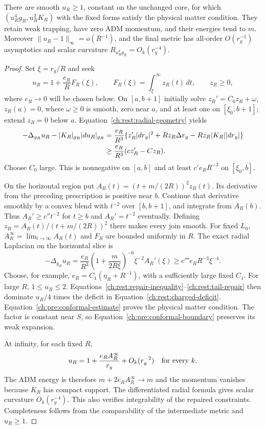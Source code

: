 \begin{lemma}
\label{ch:rest:charged-repair}
There are smooth $u_R\ge1$, constant on the unchanged core, for which
$(u_R^4g_R,u_R^2K_R)$ with the fixed forms satisfy the physical matter
condition. They retain weak trapping, have zero ADM momentum, and their
energies tend to $m$. Moreover $\|u_R-1\|_\infty=o(R^{-1})$, and
the final metric has all-order $O(r_y^{-1})$ asymptotics and
scalar curvature $R_{u_R^4g_R}=O_k(r_y^{-4})$.
\end{lemma}
\begin{proof}
Set $\xi=r_y/R$ and seek
\[
 u_R=1+\frac{e_R}{R}F_R(\xi),\qquad
 F_R(\xi)=\int_\xi^\infty z_R(t)\,dt,
 \qquad z_R\ge0,
\]
where $e_R\to0$ will be chosen below. On $[a,b+1]$ initially solve
$z_R'=C_0z_R+\omega$, $z_R(a)=0$, where $\omega\ge0$ is smooth,
zero near $a$, and at least one on $[\xi_0,b+1]$; extend $z_R=0$
below $a$. Equation~\eqref{ch:rest:radial-geometry} yields
\begin{align}
 -\Delta_{g_R}u_R-|K_R|_{g_R}|du_R|_{g_R}
 &=\frac{e_R}{R^3}
  \{z_R'|dr_y|^2+Rz_R\Delta r_y-Rz_R|K_R||dr_y|\}\notag\\
 &\ge\frac{e_R}{R^3}(c z_R'-Cz_R).
 \label{ch:rest:repair-inequality}
\end{align}
Choose $C_0$ large. This is nonnegative on $[a,b]$ and at least
$c'e_R R^{-3}$ on $[\xi_0,b]$.

On the horizontal region put
$A_R(t)=(t+m/(2R))^2z_R(t)$. Its derivative from the preceding
prescription is positive near $b$. Continue that derivative smoothly
by a convex blend with $t^{-2}$ over $[b,b+1]$, and integrate from
$A_R(b)$. Thus $A_R'\ge c''t^{-2}$ for $t\ge b$ and
$A_R'=t^{-2}$ eventually. Defining
$z_R=A_R(t)/(t+m/(2R))^2$ there makes every join smooth. For fixed
$L_0$, $A_R^\infty=\lim_{t\to\infty}A_R(t)$ and $F_R$ are bounded
uniformly in $R$. The exact radial Laplacian on the horizontal slice is
\begin{equation}
 \label{ch:rest:tail-repair}
 -\Delta_{g_R}u_R
 =\frac{e_R}{R^3}
   \left(1+\frac m{2R\xi}\right)^{-6}\xi^{-2}A_R'(\xi)
 \ge c'''e_R R^{-3}\xi^{-4}.
\end{equation}
Choose, for example, $e_R=C_1(\eta_R+R^{-1})$, with a sufficiently
large fixed $C_1$. For large $R$, $1\le u_R\le2$.
Equations~\eqref{ch:rest:repair-inequality}--\eqref{ch:rest:tail-repair}
then dominate $u_R/4$ times the deficit in
Equation~\eqref{ch:rest:charged-deficit}.
Equation~\eqref{ch:pre:conformal-estimate} proves the physical matter condition.
The factor is constant near $S$, so
Equation~\eqref{ch:pre:conformal-boundary} preserves its weak expansion.

At infinity, for each fixed $R$,
\[
 u_R=1+\frac{e_RA_R^\infty}{r_y}+O_k(r_y^{-2})
 \quad\hbox{for every }k.
\]
The ADM energy is therefore $m+2e_RA_R^\infty\to m$ and the momentum
vanishes because $K_R$ has compact support. The differentiated radial
formula gives scalar curvature $O_k(r_y^{-4})$. This also verifies
integrability of the repaired constraints. Completeness follows from
the comparability of the intermediate metric and $u_R\ge1$.
\end{proof}

